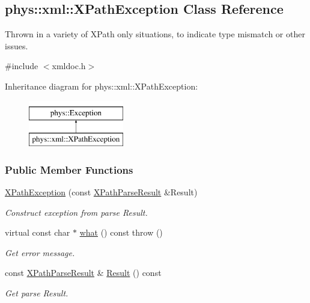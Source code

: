 \hypertarget{classphys_1_1xml_1_1XPathException}{
\subsection{phys::xml::XPathException Class Reference}
\label{d4/d30/classphys_1_1xml_1_1XPathException}
}


Thrown in a variety of XPath only situations, to indicate type mismatch or other issues.  




{\ttfamily \#include $<$xmldoc.h$>$}

Inheritance diagram for phys::xml::XPathException:\begin{figure}[H]
\begin{center}
\leavevmode
\includegraphics[height=2.000000cm]{d4/d30/classphys_1_1xml_1_1XPathException}
\end{center}
\end{figure}
\subsubsection*{Public Member Functions}
\begin{DoxyCompactItemize}
\item 
\hypertarget{classphys_1_1xml_1_1XPathException_a39d6511632945aa46b63e80f5364e959}{
\hyperlink{classphys_1_1xml_1_1XPathException_a39d6511632945aa46b63e80f5364e959}{XPathException} (const \hyperlink{structphys_1_1xml_1_1XPathParseResult}{XPathParseResult} \&Result)}
\label{d4/d30/classphys_1_1xml_1_1XPathException_a39d6511632945aa46b63e80f5364e959}

\begin{DoxyCompactList}\small\item\em Construct exception from parse Result. \item\end{DoxyCompactList}\item 
virtual const char $\ast$ \hyperlink{classphys_1_1xml_1_1XPathException_ab16319369cd5f40990300b1b22b8f6cb}{what} () const   throw ()
\begin{DoxyCompactList}\small\item\em Get error message. \item\end{DoxyCompactList}\item 
const \hyperlink{structphys_1_1xml_1_1XPathParseResult}{XPathParseResult} \& \hyperlink{classphys_1_1xml_1_1XPathException_a5410a12f705cbbc006175c08872b5749}{Result} () const 
\begin{DoxyCompactList}\small\item\em Get parse Result. \item\end{DoxyCompactList}\end{DoxyCompactItemize}


